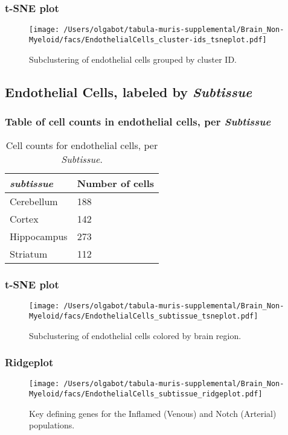 \clearpage
\subsubsection{t-SNE plot}
\begin{figure}[h]
\centering
\texttt{[image: /Users/olgabot/tabula-muris-supplemental/Brain\_Non-Myeloid/facs/EndothelialCells\_cluster-ids\_tsneplot.pdf]}

\caption{Subclustering of endothelial cells grouped by cluster ID.
}
\end{figure}


\clearpage
\subsection{Endothelial Cells, labeled by \emph{Subtissue}}
\subsubsection{Table of cell counts in endothelial cells, per \emph{Subtissue}}\begin{table}[h]
\centering
\label{my-label}
\begin{tabular}{@{}ll@{}}
\toprule

\emph{subtissue}& Number of cells \\ \midrule
Cerebellum & 188 \\

Cortex & 142 \\

Hippocampus & 273 \\

Striatum & 112 \\
\bottomrule
\end{tabular}
\caption{Cell counts for endothelial cells, per \emph{Subtissue}.}
\end{table}

\clearpage
\subsubsection{t-SNE plot}
\begin{figure}[h]
\centering
\texttt{[image: /Users/olgabot/tabula-muris-supplemental/Brain\_Non-Myeloid/facs/EndothelialCells\_subtissue\_tsneplot.pdf]}

\caption{Subclustering of endothelial cells colored by brain region.
}
\end{figure}


\clearpage
\subsubsection{Ridgeplot}
\begin{figure}[h]
\centering
\texttt{[image: /Users/olgabot/tabula-muris-supplemental/Brain\_Non-Myeloid/facs/EndothelialCells\_subtissue\_ridgeplot.pdf]}

\caption{Key defining genes for the Inflamed (Venous) and Notch (Arterial) populations.
}
\end{figure}


